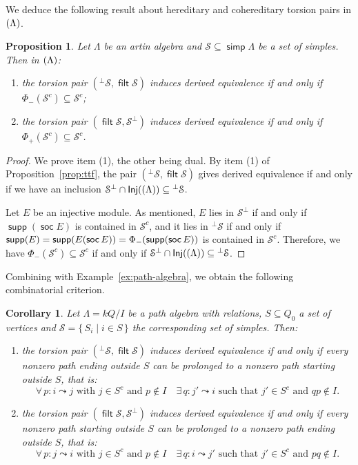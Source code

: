 \documentclass[a4paper,11pt]{amsart}
\theoremstyle{plain}
\newtheorem{prop}[thm]{Proposition}
\newtheorem{cor}[thm]{Corollary}
\theoremstyle{definition}
\newcommand{\Scal}{\mathcal{S}} \newcommand{\Tcal}{\mathcal{T}} \newcommand{\Ucal}{\mathcal{U}}
\DeclareMathOperator{\Inj}{\mathsf{Inj}}
\DeclareMathOperator{\simp}{\mathsf{simp}}
\DeclareMathOperator{\soc}{\mathsf{soc}}
\let\top\relax
\DeclareMathOperator{\top}{\mathsf{top}}
\DeclareMathOperator{\filt}{\mathsf{filt}}
\let\mod\relax
\DeclareMathOperator{\mod}{\mathsf{mod}}
\DeclareMathOperator{\supp}{\mathsf{supp}}
\begin{document}
We deduce the following result about hereditary and cohereditary
torsion pairs in $\mod(\Lambda)$.

\begin{prop}\label{prop:phi-criterion}
	Let $\Lambda$ be an artin algebra and $\Scal\subseteq\simp\Lambda$ be a set of
	simples. Then in $\mod(\Lambda)$:
	\begin{enumerate}
		\item the torsion pair $({}^\bot\Scal,\filt\Scal)$ induces derived equivalence if and only if
			$\Phi_-(\Scal^c)\subseteq\Scal^c$;
		\item the torsion pair $(\filt\Scal,\Scal^\bot)$
			induces derived equivalence if and only if
			$\Phi_+(\Scal^c)\subseteq\Scal^c$.
	\end{enumerate}
\end{prop}

\begin{proof}
	We prove item (1), the other being dual. By item (1) of
	Proposition~\ref{prop:ttf}, the pair $({}^\bot\Scal,\filt\Scal)$ gives derived
	equivalence if and only if we have an inclusion
	$\Scal^\bot\cap\Inj(\mod(\Lambda))\subseteq{}^\bot\Scal$.

	Let $E$ be an injective module.
	As mentioned, $E$ lies in $\Scal^\bot$ if and only if $\supp(\soc E)$
	is contained in $\Scal^c$, and it lies in ${}^\bot\Scal$ if and
	only if $\supp(\top E)=\supp(\top E(\soc E))=\Phi_-(\supp(\soc E))$ is contained
	in $\Scal^c$. Therefore, we have $\Phi_-(\Scal^c)\subseteq\Scal^c$ if and only
	if $\Scal^\bot\cap\Inj(\mod(\Lambda))\subseteq {}^\bot\Scal$.
\end{proof}

Combining with Example~\ref{ex:path-algebra}, we obtain the following
combinatorial criterion.

\begin{cor}\label{cor:path-algebra}
	Let $\Lambda=kQ/I$ be a path algebra with relations, $S\subseteq Q_0$ a set of
	vertices and $\Scal=\{\,S_i\mid i \in S\,\}$ the corresponding set of simples.
	Then:
	\begin{enumerate}
		\item the torsion pair $({}^\bot\Scal,\filt\Scal)$ induces derived
			equivalence if and only if every nonzero path ending outside $S$ can be prolonged to
			a nonzero path starting outside $S$, that is:
			\[\forall\,p\colon i\leadsto j\text{ with }j\in S^c\text{ and }p\notin
			I\quad
			\exists\, q\colon j'\leadsto i\text{ such that }j'\in S^c\text{ and }qp\notin
			I.\]
		\item the torsion pair  $(\filt\Scal,\Scal^\bot)$ induces derived
			equivalence if and only if every nonzero path starting outside $S$ can be prolonged to
			a nonzero path ending outside $S$, that is:
			\[\forall\,p\colon j\leadsto i\text{ with }j\in S^c\text{ and }p\notin
			I\quad
			\exists\, q\colon i\leadsto j'\text{ such that }j'\in S^c\text{ and }pq\notin
			I.\]
	\end{enumerate}
\end{cor}
\end{document}
